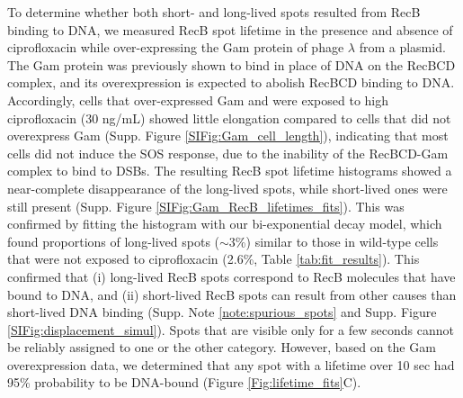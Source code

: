 To determine whether both short- and long-lived spots resulted from RecB binding to DNA, we measured RecB spot lifetime in the presence and absence of ciprofloxacin while over-expressing the Gam protein of phage $\lambda$ from a plasmid. The Gam protein was previously shown to bind in place of DNA on the RecBCD complex\cite{Wilkinson2016}, and its overexpression is expected to abolish RecBCD binding to DNA. Accordingly, cells that over-expressed Gam and were exposed to high ciprofloxacin (30 ng/mL) showed little elongation compared to cells that did not overexpress Gam (Supp. Figure \ref{SIFig:Gam_cell_length}), indicating that most cells did not induce the SOS response, due to the inability of the RecBCD-Gam complex to bind to DSBs. The resulting RecB spot lifetime histograms showed a near-complete disappearance of the long-lived spots, while short-lived ones were still present (Supp. Figure \ref{SIFig:Gam_RecB_lifetimes_fits}). This was confirmed by fitting the histogram with our bi-exponential decay model, which found proportions of long-lived spots ($\sim$3\%) similar to those in wild-type cells that were not exposed to ciprofloxacin (2.6\%, Table \ref{tab:fit_results}). This confirmed that (i) long-lived RecB spots correspond to RecB molecules that have bound to DNA, and (ii) short-lived RecB spots can result from other causes than short-lived DNA binding (Supp. Note \ref{note:spurious_spots} and Supp. Figure \ref{SIFig:displacement_simul}). Spots that are visible only for a few seconds cannot be reliably assigned to one or the other category. However, based on the Gam overexpression data, we determined that any spot with a lifetime over 10 sec had 95\% probability to be DNA-bound (Figure \ref{Fig:lifetime_fits}C).

